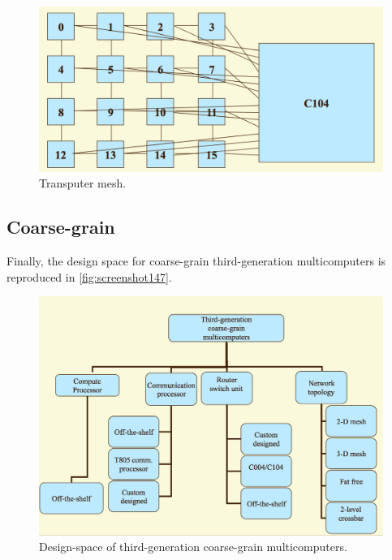 \begin{figure}
\centering
\includegraphics[width=0.7\linewidth]{screenshot146}
\caption{Transputer mesh.}
\label{fig:screenshot146}
\end{figure}

\subsection{Coarse-grain}
Finally, the design space for coarse-grain third-generation multicomputers is reproduced in \autoref{fig:screenshot147}.

\begin{figure}
\centering
\includegraphics[width=\linewidth]{screenshot147}
\caption{Design-space of third-generation coarse-grain multicomputers.}
\label{fig:screenshot147}
\end{figure}
